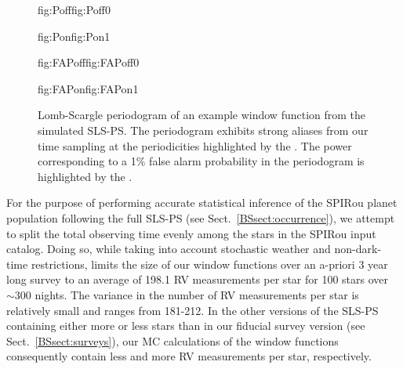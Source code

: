 \begin{figure}
  \centering
  \hspace{-\hsize}%
  \begin{ocg}{fig:Poff}{fig:Poff}{0}%
  \end{ocg}%
  \begin{ocg}{fig:Pon}{fig:Pon}{1}%
  \end{ocg}
  \hspace{-\hsize}%
  \begin{ocg}{fig:FAPoff}{fig:FAPoff}{0}%
  \end{ocg}%
  \begin{ocg}{fig:FAPon}{fig:FAPon}{1}%
  \end{ocg}
  \hspace{-\hsize}%
  \caption{Lomb-Scargle periodogram of an example window function from the simulated SLS-PS.
    The periodogram exhibits strong aliases from our time sampling at the periodicities
    highlighted by the 
    . The power
    corresponding to a 1\% false alarm probability in the periodogram is highlighted by the  
    .}
  \label{BSfig:wfs}
\end{figure}

For the purpose of performing accurate statistical inference of the SPIRou planet population
following the full SLS-PS (see Sect.~\ref{BSsect:occurrence}),
we attempt to split the total observing time evenly among the stars in the
SPIRou input catalog. Doing so, while taking into account stochastic weather and non-dark-time restrictions,
limits the size of our window functions over an a-priori 3 year long survey to an average of
198.1 RV measurements per star for 100 stars over $\sim 300$ nights. The variance in the number of RV
measurements per star is relatively small and ranges from 181-212. 
In the other versions of the SLS-PS containing either more or less stars than in our fiducial survey version
(see Sect.~\ref{BSsect:surveys}),
our MC calculations of the window functions consequently contain less and more RV measurements per star, respectively.

